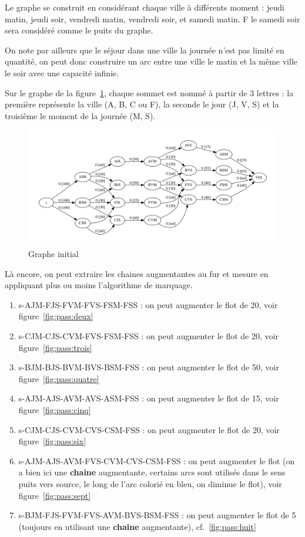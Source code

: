 Le graphe se construit en considérant chaque ville à différents moment : jeudi matin, jeudi soir, vendredi matin, vendredi soir, et samedi matin. F le samedi soir sera considéré comme le puits du graphe.

On note par ailleurs que le séjour dans une ville la journée n'est pas limité en quantité, on peut donc construire un arc entre une ville le matin et la même ville le soir avec une capacité infinie.

Sur le graphe de la figure~\ref{fig:pass:un}, chaque sommet est nommé à partir de 3 lettres : la première représente la ville (A,  B, C ou F), la seconde le jour (J, V, S) et la troisième le moment de la journée (M, S).

\begin{figure}[h]
\begin{center}
	\includegraphics[width=\textwidth]{figs/pass-1.pdf}
	\caption{Graphe initial}
	\label{fig:pass:un}
\end{center}
\end{figure}

Là encore, on peut extraire les chaines augmentantes au fur et mesure en appliquant plus ou moins l'algorithme de marquage.

\begin{enumerate}
\item s-AJM-FJS-FVM-FVS-FSM-FSS : on peut augmenter le flot de 20, voir figure~\ref{fig:pass:deux}
\item s-CJM-CJS-CVM-FVS-FSM-FSS : on peut augmenter le flot de 20, voir figure~\ref{fig:pass:trois}
\item s-BJM-BJS-BVM-BVS-BSM-FSS : on peut augmenter le flot de 50, voir figure~\ref{fig:pass:quatre}
\item s-AJM-AJS-AVM-AVS-ASM-FSS : on peut augmenter le flot de 15, voir figure~\ref{fig:pass:cinq}
\item s-CJM-CJS-CVM-CVS-CSM-FSS : on peut augmenter le flot de 20, voir figure~\ref{fig:pass:six}
\item s-AJM-AJS-AVM-FVS-CVM-CVS-CSM-FSS : on peut augmenter le flot (on a bien ici une \textbf{chaine} augmentante, certains arcs sont utilisés dans le sens puits vers source, le long de l'arc colorié en bleu, on diminue le flot), voir figure~\ref{fig:pass:sept}
\item s-BJM-FJS-FVM-FVS-AVM-BVS-BSM-FSS : on peut augmenter le flot de 5 (toujours en utilisant une \textbf{chaine} augmentante), cf.~\ref{fig:pass:huit}
\end{enumerate}

